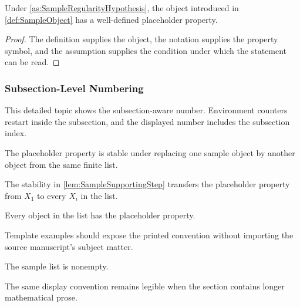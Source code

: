 \documentclass[12pt]{article}
\begin{document}
\begin{theorem}\label{thm:SampleConclusion}
Under \cref{as:SampleRegularityHypothesis}, the object introduced in
\cref{def:SampleObject} has a well-defined placeholder property.
\end{theorem}

\begin{proof}
The definition supplies the object, the notation supplies the property symbol,
and the assumption supplies the condition under which the statement can be read.
\end{proof}

\subsubsection{Subsection-Level Numbering}\label{sub:SubsectionLevelNumbering}
This detailed topic shows the subsection-aware number. Environment counters
restart inside the subsection, and the displayed number includes the subsection
index.

\begin{lemma}\label{lem:SampleSupportingStep}
The placeholder property is stable under replacing one sample object by another
object from the same finite list.
\end{lemma}

\begin{proposition}\label{prop:SampleTransfer}
The stability in \cref{lem:SampleSupportingStep} transfers the placeholder
property from \(X_1\) to every \(X_i\) in the list.
\end{proposition}

\begin{corollary}\label{cor:SampleConsequence}
Every object in the list has the placeholder property.
\end{corollary}

\begin{principle}\label{prin:SampleReadingRule}
Template examples should expose the printed convention without importing the
source manuscript's subject matter.
\end{principle}

\begin{axiom}\label{ax:SampleStartingPremise}
The sample list is nonempty.
\end{axiom}

\begin{conjecture}\label{con:SampleFutureClaim}
The same display convention remains legible when the section contains longer
mathematical prose.
\end{conjecture}
\end{document}

